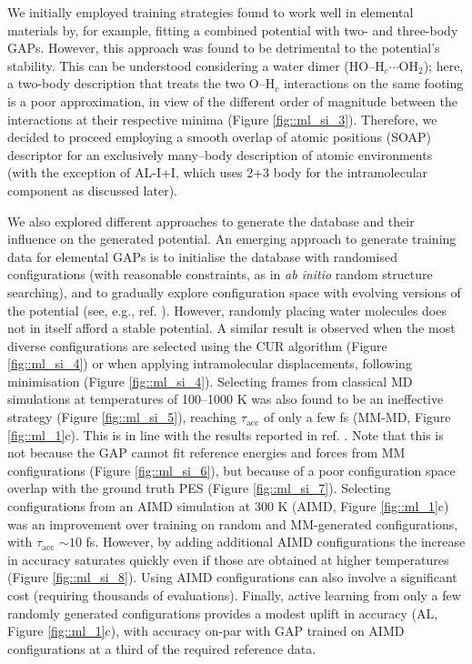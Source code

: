 \documentclass[../../main.tex]{subfiles}
\newcommand{\taua}{$\tau_\text{acc}$ }
\begin{document}
We initially employed training strategies found to work well in elemental materials by, for example, fitting a combined potential with two- and three-body GAPs. However, this approach was found to be detrimental to the potential’s stability. This can be understood considering a water dimer (HO–H${}_c \cdots$OH${}_2$); here, a two-body description that treats the two O–H${}_c$ interactions on the same footing is a poor approximation, in view of the different order of magnitude between the interactions at their respective minima (Figure \ref{fig::ml_si_3}). Therefore, we decided to proceed employing a smooth overlap of atomic positions\cite{Bartok2013} (SOAP) descriptor for an exclusively many–body description of atomic environments (with the exception of AL-I+I, which uses 2+3 body for the intramolecular component as discussed later). 

We also explored different approaches to generate the database and their influence on the generated potential. An emerging approach to generate training data for elemental GAPs is to initialise the database with randomised configurations (with reasonable constraints, as in \emph{ab initio} random structure searching\cite{Pickard2011}), and to gradually explore configuration space with evolving versions of the potential (see, e.g., ref. \cite{Bernstein2019}). However, randomly placing water molecules does not in itself afford a stable potential. A similar result is observed when the most diverse configurations are selected using the CUR algorithm\cite{Mahoney2009, Bernstein2019} (Figure \ref{fig::ml_si_4}) or when applying intramolecular displacements, following minimisation (Figure \ref{fig::ml_si_4}). Selecting frames from classical MD simulations at temperatures of 100–1000 K was also found to be an ineffective strategy (Figure \ref{fig::ml_si_5}), reaching \taua of only a few fs (MM-MD, Figure \ref{fig::ml_1}c). This is in line with the results reported in ref. \cite{Cole2020}. Note that this is not because the GAP cannot fit reference energies and forces from MM configurations (Figure \ref{fig::ml_si_6}), but because of a poor configuration space overlap with the ground truth PES (Figure \ref{fig::ml_si_7}). Selecting configurations from an AIMD simulation at 300 K (AIMD, Figure \ref{fig::ml_1}c) was an improvement over training on random and MM-generated configurations, with \taua $\sim10$ fs. However, by adding additional AIMD configurations the increase in accuracy saturates quickly even if those are obtained at higher temperatures (Figure \ref{fig::ml_si_8}). Using AIMD configurations can also involve a significant cost (requiring thousands of evaluations). Finally, active learning from only a few randomly generated configurations provides a modest uplift in accuracy (AL, Figure \ref{fig::ml_1}c), with accuracy on-par with GAP trained on AIMD configurations at a third of the required reference data.
\end{document}
